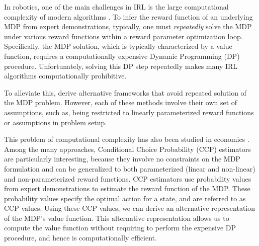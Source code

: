 \documentclass{article}
\begin{document}
In robotics, one of the main challenges in IRL is the large computational complexity of modern algorithms \cite{ziebart, Ratliff2006}. To infer the reward function of an underlying MDP from expert demonstrations, typically, one must \textit{repeatedly} solve the MDP under various reward functions within a reward parameter optimization loop. Specifically, the MDP solution, which is typically characterized by a value function, requires a computationally expensive Dynamic Programming (DP) procedure. Unfortunately, solving this DP step repeatedly makes many IRL algorithms computationally prohibitive.  

To alleviate this, \cite{klein2012inverse, dvijotham2010inverse} derive alternative frameworks that avoid repeated solution of the MDP problem. However, each of these methods involve their own set of assumptions, such as, being restricted to linearly parameterized reward functions or assumptions in problem setup. 

This problem of computational complexity has also been studied in economics \cite{hotz, su2012constrained, aguirregabiria2002swapping}. Among the many approaches, Conditional Choice Probability (CCP) estimators \cite{hotz} are particularly interesting, because they involve no constraints on the MDP formulation and can be generalized to both parameterized (linear and non-linear) and non-parameterized reward functions.
CCP estimators use probability values from expert demonstrations to estimate the reward function of the MDP. These probability values specify the optimal action for a state, and are referred to as CCP values. Using these CCP values, we can derive an alternative representation of the MDP's value function. This alternative representation allows us to compute the value function without requiring to perform the expensive DP procedure, and hence is computationally efficient.

\end{document}
